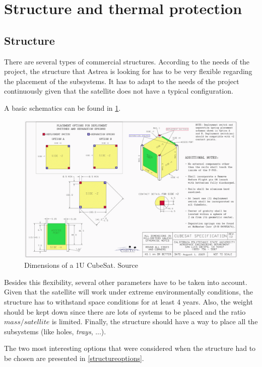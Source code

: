 \section{Structure and thermal protection}
\subsection{Structure}
There are several types of commercial structures. According to the needs of the project, the structure that Astrea is looking for has to be very flexible regarding the placement of the subsystems. It has to adapt to the needs of the project continuously given that the satellite does not have a typical configuration.

A basic schematics can be found in \ref{epsschematics}.

\begin{figure}[H]
\includegraphics[scale=0.6]{./sections/SatelliteDept/sections/images/CubeSatDesign}
\centering
\caption[Dimensions of a 1U CubeSat]{Dimensions of a 1U CubeSat. Source \cite{CalPoly2014}}
\label{epsschematics}
\end{figure}

Besides this flexibility, several other parameters have to be taken into account. Given that the satellite will work under extreme environmentally conditions, the structure has to withstand space conditions for at least 4 years. Also, the weight should be kept down since there are lots of systems to be placed and the ratio $ mass / satellite $ is limited. Finally, the structure should have a way to place all the subsystems (like holes, \textit{trays}, ...).

The two most interesting options that were considered when the structure had to be chosen are presented in \ref{structureoptions}.

